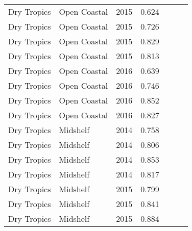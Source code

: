 {\begin{longtable}{llccccc}
  Dry Tropics & Open Coastal & 2015 & 0.624 & \cellcolor[HTML]{F0C918}{C} & \cellcolor[HTML]{B0D235}{B} & \cellcolor[HTML]{F0C918}{C} \\ 
  Dry Tropics & Open Coastal & 2015 & 0.726 & \cellcolor[HTML]{B0D235}{B} & \cellcolor[HTML]{B0D235}{B} & \cellcolor[HTML]{B0D235}{B} \\ 
  Dry Tropics & Open Coastal & 2015 & 0.829 & \cellcolor[HTML]{B0D235}{B} & \cellcolor[HTML]{00734D}{A} & \cellcolor[HTML]{B0D235}{B} \\ 
  Dry Tropics & Open Coastal & 2015 & 0.813 & \cellcolor[HTML]{B0D235}{B} & \cellcolor[HTML]{00734D}{A} & \cellcolor[HTML]{B0D235}{B} \\ 
  Dry Tropics & Open Coastal & 2016 & 0.639 & \cellcolor[HTML]{F0C918}{C} & \cellcolor[HTML]{B0D235}{B} & \cellcolor[HTML]{F0C918}{C} \\ 
  Dry Tropics & Open Coastal & 2016 & 0.746 & \cellcolor[HTML]{B0D235}{B} & \cellcolor[HTML]{B0D235}{B} & \cellcolor[HTML]{B0D235}{B} \\ 
  Dry Tropics & Open Coastal & 2016 & 0.852 & \cellcolor[HTML]{00734D}{A} & \cellcolor[HTML]{00734D}{A} & \cellcolor[HTML]{00734D}{A} \\ 
  Dry Tropics & Open Coastal & 2016 & 0.827 & \cellcolor[HTML]{B0D235}{B} & \cellcolor[HTML]{00734D}{A} & \cellcolor[HTML]{B0D235}{B} \\ 
  Dry Tropics & Midshelf & 2014 & 0.758 & \cellcolor[HTML]{B0D235}{B} & \cellcolor[HTML]{B0D235}{B} & \cellcolor[HTML]{B0D235}{B} \\ 
  Dry Tropics & Midshelf & 2014 & 0.806 & \cellcolor[HTML]{B0D235}{B} & \cellcolor[HTML]{00734D}{A} & \cellcolor[HTML]{B0D235}{B} \\ 
  Dry Tropics & Midshelf & 2014 & 0.853 & \cellcolor[HTML]{00734D}{A} & \cellcolor[HTML]{00734D}{A} & \cellcolor[HTML]{00734D}{A} \\ 
  Dry Tropics & Midshelf & 2014 & 0.817 & \cellcolor[HTML]{B0D235}{B} & \cellcolor[HTML]{00734D}{A} & \cellcolor[HTML]{B0D235}{B} \\ 
  Dry Tropics & Midshelf & 2015 & 0.799 & \cellcolor[HTML]{B0D235}{B} & \cellcolor[HTML]{B0D235}{B} & \cellcolor[HTML]{B0D235}{B} \\ 
  Dry Tropics & Midshelf & 2015 & 0.841 & \cellcolor[HTML]{00734D}{A} & \cellcolor[HTML]{00734D}{A} & \cellcolor[HTML]{B0D235}{B} \\ 
  Dry Tropics & Midshelf & 2015 & 0.884 & \cellcolor[HTML]{00734D}{A} & \cellcolor[HTML]{00734D}{A} & \cellcolor[HTML]{00734D}{A} \\ 

\end{longtable}}
